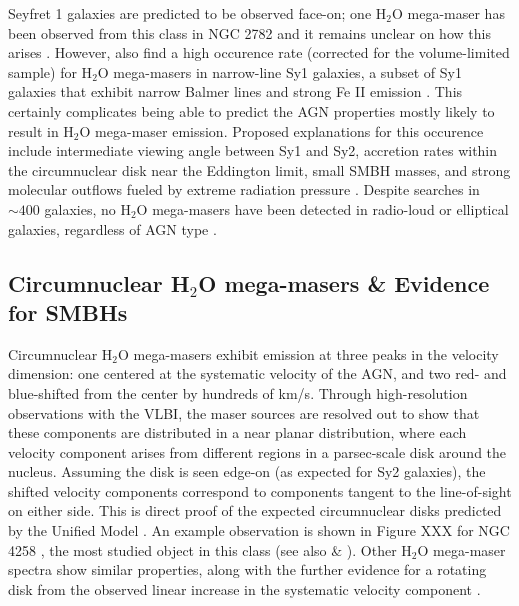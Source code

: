 Seyfret 1 galaxies are predicted to be observed face-on; one H$_2$O mega-maser has been observed from this class in NGC 2782 and it remains unclear on how this arises \citep{Tarchi_2011}. However, \citet{Tarchi_2011} also find a high occurence rate (corrected for the volume-limited sample) for H$_2$O mega-masers in narrow-line Sy1 galaxies, a subset of Sy1 galaxies that exhibit narrow Balmer lines and strong Fe II emission \citep{tarchi2012}. This certainly complicates being able to predict the AGN properties mostly likely to result in H$_2$O mega-maser emission. Proposed explanations for this occurence include intermediate viewing angle between Sy1 and Sy2, accretion rates within the circumnuclear disk near the Eddington limit, small SMBH masses, and strong molecular outflows fueled by extreme radiation pressure \citep{tarchi2012}. Despite searches in $\sim 400$ galaxies, no H$_2$O mega-masers have been detected in radio-loud or elliptical galaxies, regardless of AGN type \citep{tarchi2012}. 


\subsection{Circumnuclear H$_2$O mega-masers \& Evidence for SMBHs}
\label{sub:h20_agn}

Circumnuclear H$_2$O mega-masers exhibit emission at three peaks in the velocity dimension: one centered at the systematic velocity of the AGN, and two red- and blue-shifted from the center by hundreds of km/s. Through high-resolution observations with the VLBI, the maser sources are resolved out to show that these components are distributed in a near planar distribution, where each velocity component arises from different regions in a parsec-scale disk around the nucleus. Assuming the disk is seen edge-on (as expected for Sy2 galaxies), the shifted velocity components correspond to components tangent to the line-of-sight on either side. This is direct proof of the expected circumnuclear disks predicted by the Unified Model \citep{lo2005}. An example observation is shown in Figure XXX for NGC 4258 \citep{Bragg_2000}, the most studied object in this class (see also \citet{Miyoshi_1994} \& \citet{Herrnstein_1999}). Other H$_2$O mega-maser spectra show similar properties, along with the further evidence for a rotating disk from the observed linear increase in the systematic velocity component \citep{lo2005}.  

